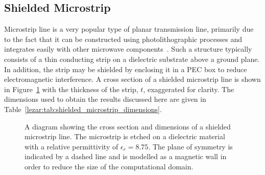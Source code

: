 \subsection{Shielded Microstrip}
\label{lezar:sec:shielded_microstrip}
Microstrip line is a very popular type of planar transmission line,
primarily due to the fact that it can be constructed using
photolithographic processes and integrates easily with other microwave
components~\cite{Pozar2005}. Such a structure typically consists of a
thin conducting strip on a dielectric substrate above a ground
plane. In addition, the strip may be shielded by enclosing it in a PEC
box to reduce electromagnetic interference. A cross section of a
shielded microstrip line is shown in
Figure~\ref{lezar:fig:shielded_microstrip} with the thickness of the strip,
$t$, exaggerated for clarity. The dimensions used to obtain the
results discussed here are given in
Table~\ref{lezar:tab:shielded_microstrip_dimensions}.
\begin{figure}[t]
    \centering
    \caption{A diagram showing the cross section and dimensions of a shielded microstrip line.  The microstrip is etched on a dielectric material with a relative permittivity of $\epsilon_r = 8.75$.  The plane of symmetry is indicated by a dashed line and is modelled as a magnetic wall in order to reduce the size of the computational domain.}
    \label{lezar:fig:shielded_microstrip}
\end{figure}
